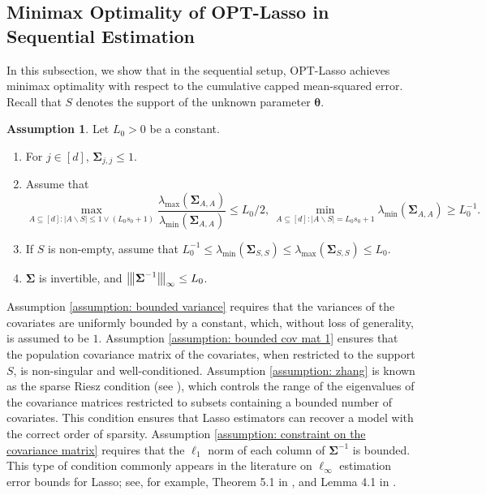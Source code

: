 \documentclass[aos,preprint]{imsart}
\theoremstyle{plain}
\theoremstyle{definition}
\newtheorem{assumption}{Assumption}
\newcommand{\btheta}{\boldsymbol{\theta}}
\newcommand{\bSigma}{\boldsymbol{\Sigma}}
\newcommand{\op}[1]{{\left\vert\kern-0.25ex\left\vert\kern-0.25ex\left\vert #1\right\vert\kern-0.25ex\right\vert\kern-0.25ex\right\vert}}
\newcommand{\lmin}[1]{\lambda_{\min}\left(#1\right)}
\newcommand{\lmax}[1]{\lambda_{\max}\left(#1\right)}
\begin{document}
\subsection{Minimax Optimality of OPT-Lasso in  Sequential Estimation}\label{subsec:minimax_rate}
In this subsection, we show that in the sequential setup, OPT-Lasso achieves minimax optimality with respect to the cumulative capped mean-squared error. Recall that $S$ denotes the support of the unknown parameter $\btheta$.

\begin{assumption} \label{assumption: sequential estimation}
Let $L_0>0$ be a constant. 
\begin{enumerate}[label={(\alph*)}, ref={\theassumption\ (\alph*)}]
\item \label{assumption: bounded variance} For $j \in [d]$, $\bSigma_{j,j}\le 1$. 
\item \label{assumption: zhang}
  Assume that
$$\max_{A\subseteq [d]: |A\backslash S|\le 1\vee (L_0s_0+1)} \frac{\lmax{\bSigma_{A,A}}}{\lmin{\bSigma_{A,A}}} \le L_0/2, \ \min_{A\subseteq[d]: |A\backslash S|=L_0s_0+1} \lmin{\bSigma_{A,A}} \ge L_0^{-1}.$$
\item \label{assumption: bounded cov mat 1}
If $S$ is non-empty, assume that $L_0^{-1}\le \lmin{\bSigma_{S,S}}\le\lmax{\bSigma_{S,S}}\le L_0$.
\item \label{assumption: constraint on the covariance matrix}
$\bSigma$ is invertible, and $\op{\bSigma^{-1}}_{\infty} \le L_0$.
\end{enumerate}
\end{assumption}

Assumption \ref{assumption: bounded variance} requires that the variances of the covariates are uniformly bounded by a constant, which, without loss of generality, is assumed to be $1$. Assumption \ref{assumption: bounded cov mat 1} ensures that the population covariance matrix of the covariates, when restricted to the support $S$, is non-singular and well-conditioned. Assumption \ref{assumption: zhang} is known as the sparse Riesz condition (see \cite{zhang2008sparsity,bellec2022biasing}), which controls the range of the eigenvalues of the covariance matrices restricted to subsets containing a bounded number of covariates. This condition ensures that Lasso estimators can recover a model with the correct order of sparsity. Assumption \ref{assumption: constraint on the covariance matrix} requires that the $\ell_1$ norm of each column of $\bSigma^{-1}$ is bounded. This type of condition commonly appears in the literature on $\ell_{\infty}$ estimation error bounds for Lasso; see, for example, Theorem 5.1 in \cite{bellec2022biasing}, and Lemma 4.1 in \cite{van2016estimation}.
\end{document}
